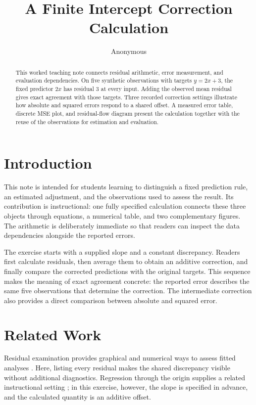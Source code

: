 \documentclass[11pt]{article}
\title{A Finite Intercept Correction Calculation}
\author{Anonymous}
\date{}
\begin{document}
\maketitle

\begin{abstract}
This worked teaching note connects residual arithmetic, error measurement, and evaluation dependencies. On five synthetic observations with targets $y=2x+3$, the fixed predictor $2x$ has residual $3$ at every input. Adding the observed mean residual gives exact agreement with those targets. Three recorded correction settings illustrate how absolute and squared errors respond to a shared offset. A measured error table, discrete MSE plot, and residual-flow diagram present the calculation together with the reuse of the observations for estimation and evaluation.
\end{abstract}

\section{Introduction}

This note is intended for students learning to distinguish a fixed prediction rule, an estimated adjustment, and the observations used to assess the result. Its contribution is instructional: one fully specified calculation connects these three objects through equations, a numerical table, and two complementary figures. The arithmetic is deliberately immediate so that readers can inspect the data dependencies alongside the reported errors.

The exercise starts with a supplied slope and a constant discrepancy. Readers first calculate residuals, then average them to obtain an additive correction, and finally compare the corrected predictions with the original targets. This sequence makes the meaning of exact agreement concrete: the reported error describes the same five observations that determine the correction. The intermediate correction also provides a direct comparison between absolute and squared error.

\section{Related Work}

Residual examination provides graphical and numerical ways to assess fitted analyses \cite{Anscombe1963ExaminationAnalysis}. Here, listing every residual makes the shared discrepancy visible without additional diagnostics. Regression through the origin supplies a related instructional setting \cite{Eisenhauer2003RegressionThrough}; in this exercise, however, the slope is specified in advance, and the calculated quantity is an additive offset.
\end{document}
